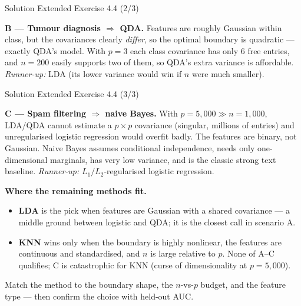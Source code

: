 \documentclass[aspectratio=169,11pt]{beamer}
\begin{document}
\begin{frame}{Solution \textemdash{} Extended Exercise 4.4 (2/3)}
\begin{solutionbox}
\vspace{1mm}
\textbf{B --- Tumour diagnosis $\Rightarrow$ QDA.}
Features are roughly Gaussian within class, but the covariances clearly
\emph{differ}, so the optimal boundary is quadratic --- exactly QDA's
model. With $p=3$ each class covariance has only $6$ free entries, and
$n=200$ easily supports two of them, so QDA's extra variance is
affordable. \emph{Runner-up:} LDA (its lower variance would win if $n$
were much smaller).
\end{solutionbox}
\end{frame}

\begin{frame}{Solution \textemdash{} Extended Exercise 4.4 (3/3)}
\begin{solutionbox}
\scriptsize
\textbf{C --- Spam filtering $\Rightarrow$ naive Bayes.}
With $p=5{,}000\gg n=1{,}000$, LDA/QDA cannot estimate a $p\times p$
covariance (singular, millions of entries) and unregularised logistic
regression would overfit badly. The features are binary, not Gaussian.
Naive Bayes assumes conditional independence, needs only one-dimensional
marginals, has very low variance, and is the classic strong text
baseline. \emph{Runner-up:} $L_1/L_2$-regularised logistic regression.

\vspace{1mm}
\textbf{Where the remaining methods fit.}
\begin{itemize}
  \item \textbf{LDA} is the pick when features are Gaussian with a shared
        covariance --- a middle ground between logistic and QDA; it is the
        closest call in scenario A.
  \item \textbf{KNN} wins only when the boundary is highly nonlinear,
        the features are continuous and standardised, and $n$ is large
        relative to $p$. None of A--C qualifies; C is catastrophic for
        KNN (curse of dimensionality at $p=5{,}000$).
\end{itemize}
\begin{takeaway}
Match the method to the boundary shape, the $n$-vs-$p$ budget, and the
feature type --- then confirm the choice with held-out AUC.
\end{takeaway}
\end{solutionbox}
\end{frame}
\end{document}
